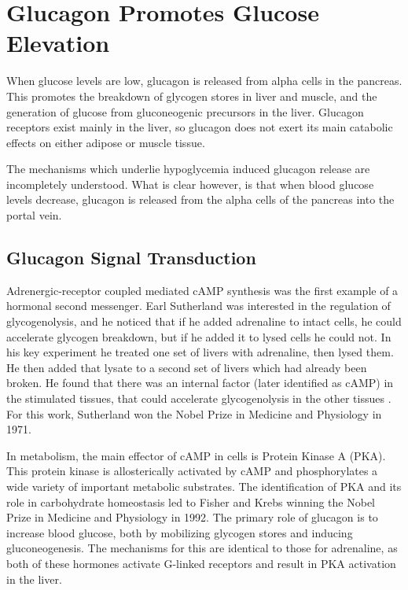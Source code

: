 \documentclass{tufte-handout}
\begin{document}
\section{Glucagon Promotes Glucose Elevation}

 When glucose levels are low, glucagon is released from alpha cells in the pancreas.  This promotes the breakdown of glycogen stores in liver and muscle, and the generation of glucose from gluconeogenic precursors in the liver.  Glucagon receptors exist mainly in the liver, so glucagon does not exert its main catabolic effects on either adipose or muscle tissue. 

The mechanisms which underlie hypoglycemia induced glucagon release are incompletely understood.  What is clear however, is that when blood glucose levels decrease, glucagon is released from the alpha cells of the pancreas into the portal vein.

\subsection{Glucagon Signal Transduction}

Adrenergic-receptor coupled mediated cAMP synthesis was the first example of a hormonal second messenger.  Earl Sutherland was interested in the regulation of glycogenolysis, and he noticed that if he added adrenaline to intact cells, he could accelerate glycogen breakdown, but if he added it to lysed cells he could not.  In his key experiment he treated one set of livers with adrenaline, then lysed them.  He then added that lysate to a second set of livers which had already been broken.  He found that there was an internal factor (later identified as cAMP) in the stimulated tissues, that could accelerate glycogenolysis in the other tissues \citep{Rall1956}. For this work, Sutherland won the Nobel Prize in Medicine and Physiology in 1971.

In metabolism, the main effector of cAMP in cells is Protein Kinase A (PKA).  This protein kinase is allosterically activated by cAMP and phosphorylates a wide variety of important metabolic substrates.  The identification of PKA and its role in carbohydrate homeostasis led to Fisher and Krebs winning the Nobel Prize in Medicine and Physiology in 1992.  The primary role of glucagon is to increase blood glucose, both by mobilizing glycogen stores and inducing gluconeogenesis.  The mechanisms for this are identical to those for adrenaline, as both of these hormones activate G-linked receptors  and result in PKA activation in the liver.
\end{document}
